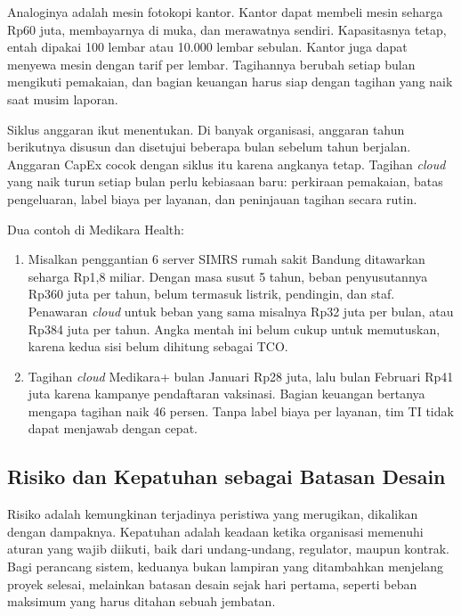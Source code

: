 Analoginya adalah mesin fotokopi kantor. Kantor dapat membeli mesin seharga Rp60 juta,
membayarnya di muka, dan merawatnya sendiri. Kapasitasnya tetap, entah dipakai 100
lembar atau 10.000 lembar sebulan. Kantor juga dapat menyewa mesin dengan tarif per
lembar. Tagihannya berubah setiap bulan mengikuti pemakaian, dan bagian keuangan harus
siap dengan tagihan yang naik saat musim laporan.

Siklus anggaran ikut menentukan. Di banyak organisasi, anggaran tahun berikutnya disusun
dan disetujui beberapa bulan sebelum tahun berjalan. Anggaran CapEx cocok dengan siklus
itu karena angkanya tetap. Tagihan \textit{cloud} yang naik turun setiap bulan perlu
kebiasaan baru: perkiraan pemakaian, batas pengeluaran, label biaya per layanan, dan
peninjauan tagihan secara rutin.

Dua contoh di Medikara Health:
\begin{enumerate}
  \item Misalkan penggantian 6 server SIMRS rumah sakit Bandung ditawarkan seharga Rp1,8
        miliar. Dengan masa susut 5 tahun, beban penyusutannya Rp360 juta per tahun,
        belum termasuk listrik, pendingin, dan staf. Penawaran \textit{cloud} untuk beban
        yang sama misalnya Rp32 juta per bulan, atau Rp384 juta per tahun. Angka mentah
        ini belum cukup untuk memutuskan, karena kedua sisi belum dihitung sebagai TCO.
  \item Tagihan \textit{cloud} Medikara+ bulan Januari Rp28 juta, lalu bulan Februari
        Rp41 juta karena kampanye pendaftaran vaksinasi. Bagian keuangan bertanya
        mengapa tagihan naik 46 persen. Tanpa label biaya per layanan, tim TI tidak
        dapat menjawab dengan cepat.
\end{enumerate}

\subsection{Risiko dan Kepatuhan sebagai Batasan Desain}

Risiko adalah kemungkinan terjadinya peristiwa yang merugikan, dikalikan dengan
dampaknya. Kepatuhan adalah keadaan ketika organisasi memenuhi aturan yang wajib
diikuti, baik dari undang-undang, regulator, maupun kontrak. Bagi perancang sistem,
keduanya bukan lampiran yang ditambahkan menjelang proyek selesai, melainkan batasan
desain sejak hari pertama, seperti beban maksimum yang harus ditahan sebuah jembatan.

